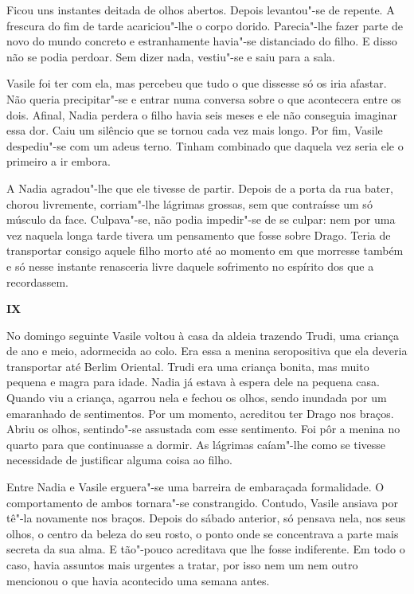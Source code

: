 Ficou uns instantes deitada de olhos abertos. Depois levantou"-se de
repente. A frescura do fim de tarde acariciou"-lhe o corpo dorido.
Parecia"-lhe fazer parte de novo do mundo concreto e estranhamente
havia"-se distanciado do filho. E disso não se podia perdoar. Sem dizer
nada, vestiu"-se e saiu para a sala.

Vasile foi ter com ela, mas percebeu que tudo o que dissesse só os iria
afastar. Não queria precipitar"-se e entrar numa conversa sobre o que
acontecera entre os dois. Afinal, Nadia perdera o filho havia seis
meses e ele não conseguia imaginar essa dor. Caiu um silêncio que se
tornou cada vez mais longo. Por fim, Vasile despediu"-se com um adeus
terno. Tinham combinado que daquela vez seria ele o primeiro a ir
embora.

A Nadia agradou"-lhe que ele tivesse de partir. Depois de a porta da rua
bater, chorou livremente, corriam"-lhe lágrimas grossas, sem que
contraísse um só músculo da face. Culpava"-se, não podia impedir"-se de se
culpar: nem por uma vez naquela longa tarde tivera um pensamento que
fosse sobre Drago. Teria de transportar consigo aquele filho morto até
ao momento em que morresse também e só nesse instante renasceria livre
daquele sofrimento no espírito dos que a recordassem.


\pagebreak
\movetooddpage
\vspace*{1.8cm}
\noindent{}\textbf{IX}

\bigskip

No domingo seguinte Vasile voltou à casa da aldeia trazendo Trudi, uma
criança de ano e meio, adormecida ao colo. Era essa a menina
seropositiva que ela deveria transportar até Berlim Oriental. Trudi
era uma criança bonita, mas muito pequena e magra para idade. Nadia já
estava à espera dele na pequena casa. Quando viu a criança, agarrou
nela e fechou os olhos, sendo inundada por um emaranhado de
sentimentos. Por um momento, acreditou ter Drago nos braços. Abriu os
olhos, sentindo"-se assustada com esse sentimento. Foi pôr a menina no
quarto para que continuasse a dormir. As lágrimas caíam"-lhe como se
tivesse necessidade de justificar alguma coisa ao filho.

Entre Nadia e Vasile erguera"-se uma barreira de embaraçada
formalidade. O comportamento de ambos tornara"-se constrangido. Contudo, Vasile ansiava por tê"-la novamente nos
braços. Depois do sábado anterior, só pensava nela, nos seus olhos, o
centro da beleza do seu rosto, o ponto onde se concentrava a parte mais
secreta da sua alma. E tão"-pouco acreditava que lhe fosse indiferente.
Em todo o caso, havia assuntos mais urgentes a tratar, por isso
nem um nem outro mencionou o que havia acontecido uma semana antes.

